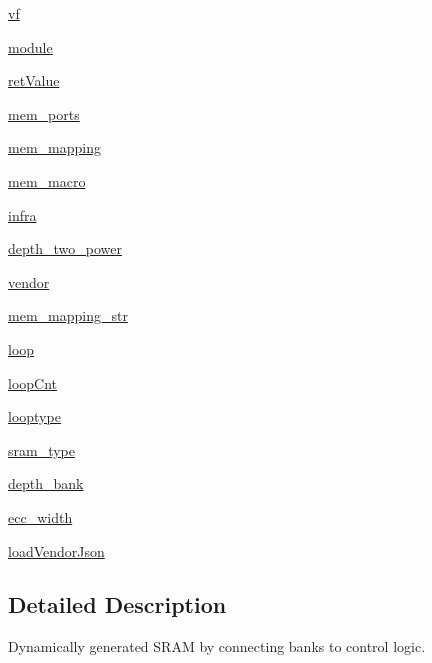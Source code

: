 \begin{DoxyCompactItemize}
\item 
\hyperlink{classsrc_1_1memgen_1_1memgen_aa1ea18a72d5eb841fef73b8001ed6e76}{vf}
\item 
\hyperlink{classsrc_1_1memgen_1_1memgen_a71c1f2f365d6c960e159e1ca9052d416}{module}
\item 
\hyperlink{classsrc_1_1memgen_1_1memgen_afa0cd64ceb700a939e0e29de5aae537f}{ret\-Value}
\item 
\hyperlink{classsrc_1_1memgen_1_1memgen_a4d57e41adac366ca6e13c7c12989922a}{mem\-\_\-ports}
\item 
\hyperlink{classsrc_1_1memgen_1_1memgen_ab27a011c63e6cf08f65282db4023a67b}{mem\-\_\-mapping}
\item 
\hyperlink{classsrc_1_1memgen_1_1memgen_a55c03c5bbe3080c2d0afcd6ebad6ba19}{mem\-\_\-macro}
\item 
\hyperlink{classsrc_1_1memgen_1_1memgen_ac9ea61edb21533d676a68f8f49815296}{infra}
\item 
\hyperlink{classsrc_1_1memgen_1_1memgen_ad56706e28c899804dc90a98940561e2b}{depth\-\_\-two\-\_\-power}
\item 
\hyperlink{classsrc_1_1memgen_1_1memgen_ae4628b0e01befe26d41770f749ec5784}{vendor}
\item 
\hyperlink{classsrc_1_1memgen_1_1memgen_a671ad993f78854c7b9aec34b44cc35ef}{mem\-\_\-mapping\-\_\-str}
\item 
\hyperlink{classsrc_1_1memgen_1_1memgen_aacd3e916fba77d2fc2fe221b1008b1c0}{loop}
\item 
\hyperlink{classsrc_1_1memgen_1_1memgen_a9b49b51842d4db270c2449a20b55b859}{loop\-Cnt}
\item 
\hyperlink{classsrc_1_1memgen_1_1memgen_ad4323625ed2124995a0ba282f4864343}{looptype}
\item 
\hyperlink{classsrc_1_1memgen_1_1memgen_a1683f1f9daea44aea2400e142c31eb87}{sram\-\_\-type}
\item 
\hyperlink{classsrc_1_1memgen_1_1memgen_ab15c6db526e7953cd279693ea074acd4}{depth\-\_\-bank}
\item 
\hyperlink{classsrc_1_1memgen_1_1memgen_a259dae72f4cb928374c26800b56c2ef9}{ecc\-\_\-width}
\item 
\hyperlink{classsrc_1_1memgen_1_1memgen_a15377e043ad5cfe7cd0551821b5052fc}{load\-Vendor\-Json}
\end{DoxyCompactItemize}


\subsection{Detailed Description}
\begin{DoxyVerb}Dynamically generated SRAM by connecting banks to control logic.     \end{DoxyVerb}
 

